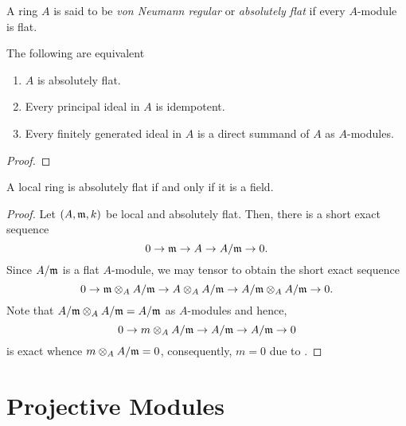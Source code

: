 \begin{definition}
    A ring $A$ is said to be \emph{von Neumann regular} or \emph{absolutely flat} if every $A$-module is flat.
\end{definition}

\begin{theorem}
    The following are equivalent
    \begin{enumerate}[label=(\alph*)]
        \item $A$ is absolutely flat. 
        \item Every principal ideal in $A$ is idempotent. 
        \item Every finitely generated ideal in $A$ is a direct summand of $A$ as $A$-modules.
    \end{enumerate}
\end{theorem}
\begin{proof}
    
\end{proof}

\begin{proposition}
    A local ring is absolutely flat if and only if it is a field.
\end{proposition}
\begin{proof}
    Let $(A,\mathfrak m, k)$ be local and absolutely flat. Then, there is a short exact sequence 
    \begin{equation*}
        0\to\mathfrak m\to A\to A/\mathfrak m\to 0.
    \end{equation*}
    Since $A/\mathfrak m$ is a flat $A$-module, we may tensor to obtain the short exact sequence 
    \begin{equation*}
        0\to\mathfrak m\otimes_A A/\mathfrak m\to A\otimes_A A/\mathfrak m\to A/\mathfrak m\otimes_A A/\mathfrak m\to 0.
    \end{equation*}
    Note that $A/\mathfrak m\otimes_A A/\mathfrak m = A/\mathfrak m$ as $A$-modules and hence, 
    \begin{equation*}
        0\to m\otimes_A A/\mathfrak m\to A/\mathfrak m\to A/\mathfrak m\to 0
    \end{equation*}
    is exact whence $m\otimes_A A/\mathfrak m = 0$, consequently, $m = 0$ due to .
\end{proof}


\section{Projective Modules}

